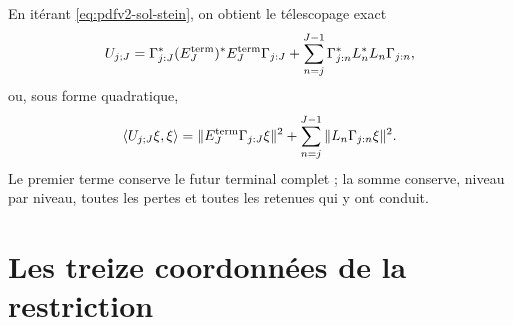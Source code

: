 En itérant \eqref{eq:pdfv2-sol-stein}, on obtient le télescopage exact
\begin{equation}\label{eq:pdfv2-sol-telescopia-operatorial}
 U_{j;J}
 =\Gamma_{j:J}^*(E_J^{\rm term})^*E_J^{\rm term}\Gamma_{j:J}
  +\sum_{n=j}^{J-1}
   \Gamma_{j:n}^*L_n^*L_n\Gamma_{j:n},
\end{equation}
ou, sous forme quadratique,
\begin{equation}\label{eq:pdfv2-sol-telescopia-normas}
 \langle U_{j;J}\xi,\xi\rangle
 =\|E_J^{\rm term}\Gamma_{j:J}\xi\|^2
  +\sum_{n=j}^{J-1}\|L_n\Gamma_{j:n}\xi\|^2.
\end{equation}
Le premier terme conserve le futur terminal complet ; la somme conserve,
niveau par niveau, toutes les pertes et toutes les retenues qui y ont conduit.

\iffalse
\section{Les treize coordonnées de la restriction}
\label{sec:pdfv2-sol-trece}

